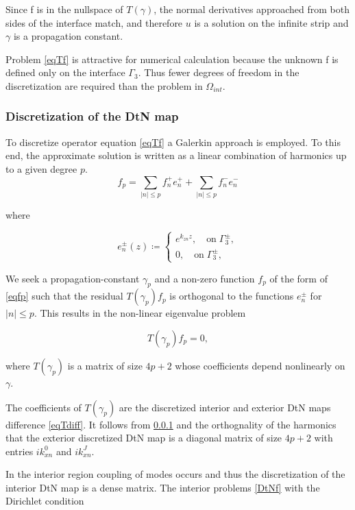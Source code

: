 Since f is in the nullspace of $T(\gamma)$, the normal derivatives
approached from both sides of the interface match, and therefore $u$
is a solution on the infinite strip and $\gamma$ is a propagation
constant.

Problem \ref{eqTf} is attractive for numerical calculation because the
unknown f is defined only on the interface $\Gamma_3$. Thus fewer
degrees of freedom in the discretization are required than the problem
in $\Omega_{int}$.

\subsubsection{Discretization of the DtN map}
To discretize operator equation \ref{eqTf} a Galerkin approach is
employed. To this end, the approximate solution is written as a linear
combination of harmonics up to a given degree $p$.
\begin{equation}
f_p = \sum_{|n|\leq p} f_n^+ e_n^+ + \sum_{|n| \leq p} f_n^- e_n^-
\label{eqfp}
\end{equation} 

where

\begin{equation}
e_n^\pm (z)\coloneqq \left \{ \begin{array} {ll}
e^{k_{zn} z}, \quad \textrm{on} \; \Gamma_3^{\pm}, \\
0, \quad \textrm{on} \; \Gamma_3^\pm,
\end{array} \right .
\label{eqepm}
\end{equation} 

We seek a propagation-constant $\gamma_p$ and a non-zero function $f_p$ of
the form of \ref{eqfp} such that the residual $T(\gamma_p) f_p$ is
orthogonal to the functions $e_n^\pm$ for $|n| \leq p$. This
results in the non-linear eigenvalue problem

\begin{equation}
T(\gamma_p) f_p = 0,
\label{eqTpfp}
\end{equation} 

where $T(\gamma_p)$ is a matrix of size $4p+2$ whose coefficients depend nonlinearly on $\gamma$.

The coefficients of $T(\gamma_p)$ are the discretized interior and
exterior DtN maps difference \ref{eqTdiff}. It follows from \ref{} and
the orthognality of the harmonics that the exterior discretized DtN
map is a diagonal matrix of size $4p+2$ with entries $ik_{xn}^0$ and
$ik_{xn}^J$.

In the interior region coupling of modes occurs and thus the
discretization of the interior DtN map is a dense matrix. The interior
problems \ref{DtNf} with the Dirichlet condition

